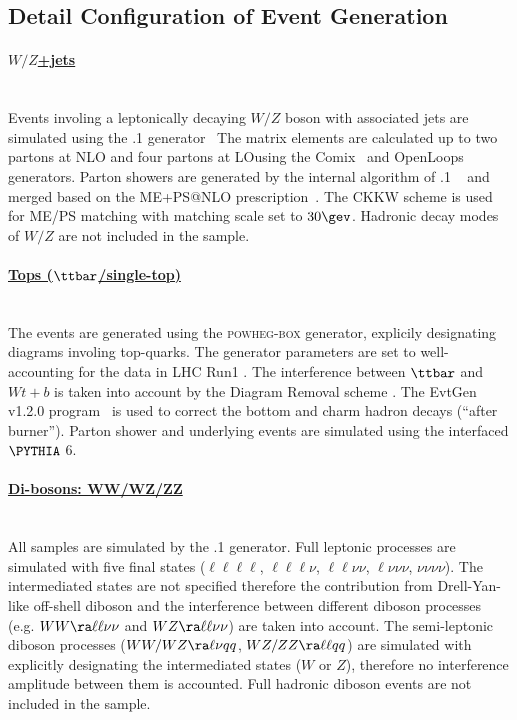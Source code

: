 \subsection{Detail Configuration of Event Generation} \label{sec::Appendix::sample_detail}
\paragraph{\underline{$W/Z$+jets}}  \mbox{} \\
Events involing a leptonically decaying $W/Z$ boson with associated jets are simulated using the .1 generator~\cite{Gleisberg:2008ta}
The matrix elements are calculated up to two partons at NLO and four partons at LO\@ using the Comix~\cite{Gleisberg:2008fv} and OpenLoops~\cite{Cascioli:2011va} generators. 
Parton showers are generated by the internal algorithm of .1 ~\cite{Schumann:2007mg} and merged based on the ME+PS@NLO prescription~\cite{Hoeche:2012yf}.
The CKKW scheme is used for ME/PS matching with matching scale set to $30\gev$.
Hadronic decay modes of $W/Z$ are not included in the sample.


\paragraph{\underline{Tops ($\ttbar$/single-top)}}  \mbox{} \\
The events are generated using the \textsc{powheg-box} generator, explicily designating diagrams involing top-quarks.
The generator parameters are set to well-accounting for the data in LHC Run1 \cite{ATLAS_ttbarGen_Run1}.
The interference between $\ttbar$ and $Wt+b$ is taken into account by the Diagram Removal scheme \cite{ttWt_intf_LHC}.
The EvtGen v1.2.0 program~\cite{EvtGen} is used to correct the bottom and charm hadron decays (``after burner''). 
Parton shower and underlying events are simulated using the interfaced $\pythia$ 6.



\paragraph{\underline{Di-bosons: WW/WZ/ZZ}}  \mbox{} \\
All samples are simulated by the .1 generator.
Full leptonic processes are simulated with five final states ($\ell\ell\ell\ell$, $\ell\ell\ell\nu$, $\ell\ell\nu\nu$, $\ell\nu\nu\nu$, $\nu\nu\nu\nu$). The intermediated states are not specified therefore the contribution from Drell-Yan-like off-shell diboson and the interference between different diboson processes (e.g. $WW\ra\ell\ell\nu\nu$ and $WZ\ra\ell\ell\nu\nu$) are taken into account. The semi-leptonic diboson processes ($WW/WZ \ra \ell\nu qq$, $WZ/ZZ \ra \ell\ell qq$) are simulated with explicitly designating the intermediated states ($W$ or $Z$), therefore no interference amplitude between them is accounted. 
Full hadronic diboson events are not included in the sample.


